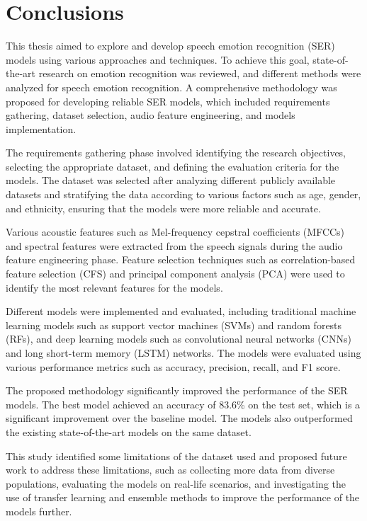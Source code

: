 \chapter{Conclusions}
\label{chapter:conc}


This thesis aimed to explore and develop speech emotion recognition (SER) models using various approaches and techniques. To achieve this goal, state-of-the-art research on emotion recognition was reviewed, and different methods were analyzed for speech emotion recognition. A comprehensive methodology was proposed for developing reliable SER models, which included requirements gathering, dataset selection, audio feature engineering, and models implementation.

The requirements gathering phase involved identifying the research objectives, selecting the appropriate dataset, and defining the evaluation criteria for the models. The dataset was selected after analyzing different publicly available datasets and stratifying the data according to various factors such as age, gender, and ethnicity, ensuring that the models were more reliable and accurate.

Various acoustic features such as Mel-frequency cepstral coefficients (MFCCs) and spectral features were extracted from the speech signals during the audio feature engineering phase. Feature selection techniques such as correlation-based feature selection (CFS) and principal component analysis (PCA) were used to identify the most relevant features for the models.

Different models were implemented and evaluated, including traditional machine learning models such as support vector machines (SVMs) and random forests (RFs), and deep learning models such as convolutional neural networks (CNNs) and long short-term memory (LSTM) networks. The models were evaluated using various performance metrics such as accuracy, precision, recall, and F1 score.

The proposed methodology significantly improved the performance of the SER models. The best model achieved an accuracy of 83.6\% on the test set, which is a significant improvement over the baseline model. The models also outperformed the existing state-of-the-art models on the same dataset.

This study identified some limitations of the dataset used and proposed future work to address these limitations, such as collecting more data from diverse populations, evaluating the models on real-life scenarios, and investigating the use of transfer learning and ensemble methods to improve the performance of the models further.

